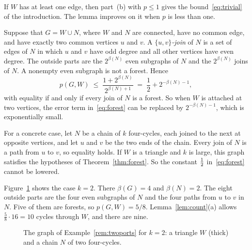 If $W$ has at least one edge, then part~(b) with $p\le1$ gives the bound~\eqref{eq:trivial} of the
introduction. The lemma improves on it when $p$ is less than one.

\begin{example}\label{rem:twoports}
Suppose that $G=W\cup N$, where $W$ and $N$ are connected, have no common edge, and have exactly two
common vertices $u$ and $v$. A \emph{$\{u,v\}$-join} of $N$ is a set of edges of $N$ in which $u$
and $v$ have odd degree and all other vertices have even degree. The outside parts are the
$2^{\beta(N)}$ even subgraphs of $N$ and the $2^{\beta(N)}$ joins of $N$. A nonempty even subgraph
is not a forest. Hence
\[
  p(G,W)\;\le\;\frac{1+2^{\beta(N)}}{2^{\beta(N)+1}}\;=\;\frac12+2^{-\beta(N)-1},
\]
with equality if and only if every join of $N$ is a forest. So when $W$ is attached at two
vertices, the error term in~\eqref{eq:forest} can be replaced by $2^{-\beta(N)-1}$, which is
exponentially small.

For a concrete case, let $N$ be a chain of $k$ four-cycles, each joined to the next at opposite
vertices, and let $u$ and $v$ be the two ends of the chain. Every join of $N$ is a path from $u$ to
$v$, so equality holds. If $W$ is a triangle and $k$ is large, this graph satisfies the hypotheses
of Theorem~\ref{thm:forest}. So the constant $\tfrac12$ in~\eqref{eq:forest} cannot be lowered.

Figure~\ref{fig:twoports} shows the case $k=2$. There $\beta(G)=4$ and $\beta(N)=2$. The eight
outside parts are the four even subgraphs of $N$ and the four paths from $u$ to $v$ in $N$. Five of
them are forests, so $p(G,W)=5/8$. Lemma~\ref{lem:count}(a) allows $\frac58\cdot16=10$ cycles
through $W$, and there are nine.
\end{example}

\begin{figure}[ht]
\centering
{}
\caption{The graph of Example~\ref{rem:twoports} for $k=2$: a triangle $W$ (thick) and a chain $N$
of two four-cycles.}
\label{fig:twoports}
\end{figure}

